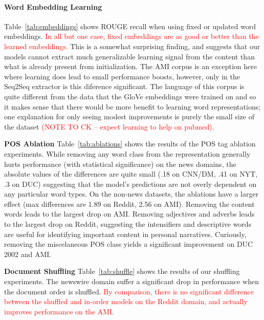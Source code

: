 \paragraph{Word Embedding Learning}{

Table~\ref{tab:embeddings} shows ROUGE recall
when using fixed or updated word embeddings. 
\textcolor{red}{In all but one case,
fixed embeddings are as good or better than the learned embeddings.}
This is a somewhat surprising finding, and suggests that our models
cannot extract much generalizable learning signal from the content than what 
is already present from initialization. 
The AMI corpus is an exception here where learning does lead to small
performance boosts, however, only in the Seq2Seq extractor is this diference 
significant. The language of this corpus is quite different from the 
data that the GloVe embeddings were trained on and so it makes sense 
that  there would be more benefit to learning word representations; one
explanation for only seeing modest improvements is purely the small size
of the dataset \textcolor{red}{(NOTE TO CK -- expect learning to help on pubmed)}.


}



\textbf{POS Ablation} Table~\ref{tab:ablations} shows the results of the POS
tag ablation experiments. 
While removing any word class from the representation generally hurts 
performance (with statistical significance) on the news domains,
the absolute values of the differences are quite small 
(.18 on CNN/DM, .41 on NYT, .3 on DUC) suggesting that the model's predictions
are not overly dependent on any particular word types. 
On the non-news datasets, the ablations have a larger effect 
(max differences are 1.89 on Reddit, 2.56 on AMI).
Removing the content words leads to the largest drop on AMI.
Removing adjectives and adverbs leads to the largest drop on Reddit,
suggesting the intensifiers and descriptive words are useful for 
identifying important content in personal narratives.
Curiously, 
removing the miscelaneous POS class yields a significant improvement
on DUC 2002 and AMI.




\textbf{Document Shuffling} Table~\ref{tab:shuffle} shows the results
of our shuffling experiments. 
The newswire domain suffer a significant drop in performance 
when the document order is shuffled. \textcolor{red}{By comparison, there is no significant difference between the shuffled and in-order models on 
the Reddit domain, and actually improves performance on the AMI}.






